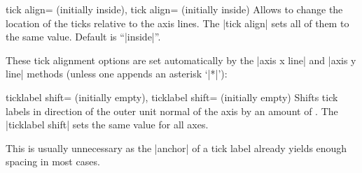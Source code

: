 \begin{pgfplotsxykeylist}{%
	\x tick align= (initially inside),
	   tick align= (initially inside)}
Allows to change the location of the ticks relative to the axis lines. The |tick align| sets all of them to the same value.
Default is ``|inside|''.
\begin{codeexample}[]
\end{codeexample}

\begin{codeexample}[]
\end{codeexample}

These tick alignment options are set automatically by the |axis x line| and |axis y line| methods (unless one appends an asterisk `|*|'):
\begin{codeexample}[]
\end{codeexample}

\end{pgfplotsxykeylist}

\begin{pgfplotsxykeylist}{%
	\x ticklabel shift= (initially empty),%
	   ticklabel shift= (initially empty)}
	Shifts tick labels in direction of the outer unit normal of the axis by an amount of . The |ticklabel shift| sets the same value for all axes.

	This is usually unnecessary as the |anchor| of a tick label already yields enough spacing in most cases.
\end{pgfplotsxykeylist}

